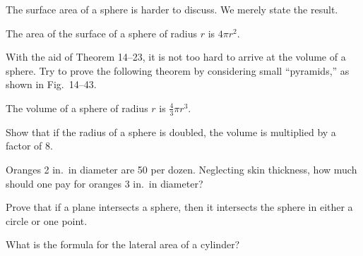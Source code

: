 \documentclass[11pt]{book}
\begin{document}
The surface area of a sphere is harder to discuss. We merely state the result.

\begin{theorem}
The area of the surface of a sphere of radius $r$ is $4\pi r^2$.
\end{theorem}

With the aid of Theorem 14--23, it is not too hard to arrive at the volume of a
sphere. Try to prove the following theorem by considering small ``pyramids,'' as
shown in Fig.~14--43.

\FIGXIVFORTYTHREE

\begin{theorem}
The volume of a sphere of radius $r$ is $\frac{4}{3}\pi r^3$.
\end{theorem}

\begin{exercisecols}
\begin{exlist}
\item Show that if the radius of a sphere is doubled, the volume is multiplied
      by a factor of 8.
\item Oranges 2 in.\ in diameter are 50\textcent{} per dozen. Neglecting skin
      thickness, how much should one pay for oranges 3 in.\ in diameter?
\item Prove that if a plane intersects a sphere, then it intersects the sphere
      in either a circle or one point.
\item What is the formula for the lateral area of a cylinder?
\end{exlist}
\end{exercisecols}
\end{document}
